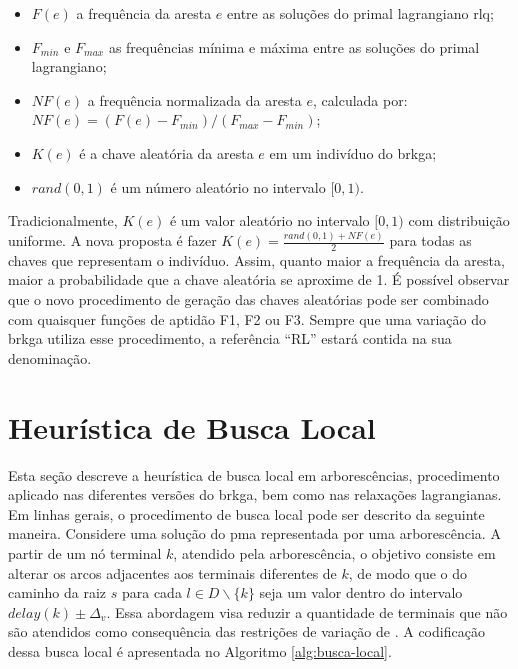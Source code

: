 \begin{itemize}
  \item  $F(e)$  a  frequência  da  aresta  $e$  entre  as  soluções  do  primal
lagrangiano \gls{rlq};
  \item $F_{min}$ e  $F_{max}$ as frequências mínima e máxima  entre as soluções
do primal lagrangiano;
  \item $NF(e)$ a frequência normalizada da  aresta $e$, calculada por: $NF(e) =
(F(e) - F_{min}) / (F_{max} - F_{min})$;
  \item $K(e)$ é a chave aleatória da aresta $e$ em um indivíduo do \gls{brkga};
  \item $rand(0, 1)$ é um número aleatório no intervalo $[0, 1)$.
\end{itemize}

Tradicionalmente,  $K(e)$  é  um  valor  aleatório no  intervalo  $[0,  1)$  com
distribuição  uniforme. A  nova  proposta é  fazer $K(e)  =  \frac{rand(0, 1)  +
NF(e)}{2}$ para todas as chaves que representam o indivíduo. Assim, quanto maior
a frequência da aresta, maior a  probabilidade que a chave aleatória se aproxime
de  1.  É possível  observar  que  o novo  procedimento  de  geração das  chaves
aleatórias pode  ser combinado com  quaisquer funções de  aptidão F1, F2  ou F3.
Sempre que uma  variação do \gls{brkga} utiliza esse  procedimento, a referência
``RL'' estará contida na sua denominação.

\section{Heurística de Busca Local} \label{sec:heuristica-bl}

Esta seção descreve a heurística  de busca local em arborescências, procedimento
aplicado  nas  diferentes  versões  do  \gls{brkga},  bem  como  nas  relaxações
lagrangianas. Em linhas gerais, o procedimento  de busca local pode ser descrito
da seguinte  maneira. Considere  uma solução do  \gls{pma} representada  por uma
arborescência. A  partir de um nó  terminal $k$, atendido pela  arborescência, o
objetivo consiste  em alterar  os arcos adjacentes  aos terminais  diferentes de
$k$,  de  modo  que  o  {\delay}  do  caminho da  raiz  $s$  para  cada  $l  \in
D\backslash\{k\}$ seja  um valor  dentro do  intervalo $delay(k)  \pm \Delta_v$.
Essa abordagem visa reduzir a quantidade de terminais que não são atendidos como
consequência das restrições  de variação de {\delay}. A  codificação dessa busca
local é apresentada no Algoritmo \ref{alg:busca-local}.

